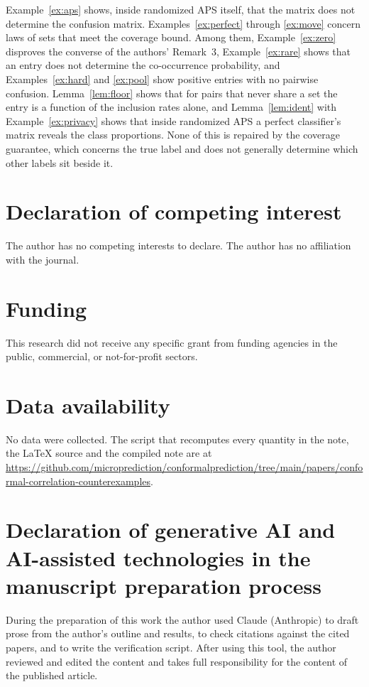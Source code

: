 \documentclass[11pt]{article}
\theoremstyle{definition}
\theoremstyle{definition}
\theoremstyle{remark}
\begin{document}
Example~\ref{ex:aps} shows, inside randomized APS itself, that the matrix does not determine the
confusion matrix. Examples~\ref{ex:perfect} through \ref{ex:move} concern laws of sets that meet the
coverage bound. Among them, Example~\ref{ex:zero} disproves the converse of the authors' Remark~3,
Example~\ref{ex:rare} shows that an entry does not determine the co-occurrence probability, and
Examples~\ref{ex:hard} and \ref{ex:pool} show positive entries with no pairwise confusion.
Lemma~\ref{lem:floor} shows that for pairs that never share a set the entry is a function of the
inclusion rates alone, and Lemma~\ref{lem:ident} with Example~\ref{ex:privacy} shows that inside
randomized APS a perfect classifier's matrix reveals the class proportions. None of this is repaired by the coverage guarantee, which concerns the true label and does not
generally determine which other labels sit beside it.

\section*{Declaration of competing interest}

The author has no competing interests to declare. The author has no affiliation with the journal.

\section*{Funding}

This research did not receive any specific grant from funding agencies in the public, commercial,
or not-for-profit sectors.

\section*{Data availability}

No data were collected. The script that recomputes every quantity in the note, the \LaTeX{} source
and the compiled note are at
\url{https://github.com/microprediction/conformalprediction/tree/main/papers/conformal-correlation-counterexamples}.

\section*{Declaration of generative AI and AI-assisted technologies in the manuscript preparation process}

During the preparation of this work the author used Claude (Anthropic) to draft prose from the
author's outline and results, to check citations against the cited papers, and to write the
verification script. After using this tool, the author reviewed and edited the content and takes
full responsibility for the content of the published article.
\end{document}
